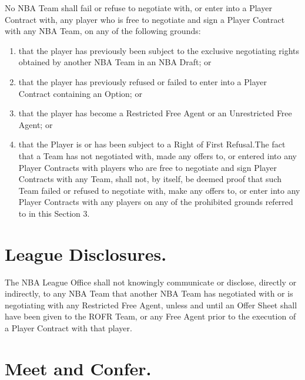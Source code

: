 \documentclass[
]{book}
\providecommand{\tightlist}{%
  \setlength{\itemsep}{0pt}\setlength{\parskip}{0pt}}
\begin{document}
No NBA Team shall fail or refuse to negotiate with, or enter into a Player Contract with, any player who is free to negotiate and sign a Player Contract with any NBA Team, on any of the following grounds:

\begin{enumerate}
\def\labelenumi{(\alph{enumi})}
\tightlist
\item
  that the player has previously been subject to the exclusive negotiating rights obtained by another NBA Team in an NBA Draft; or
\item
  that the player has previously refused or failed to enter into a Player Contract containing an Option; or
\item
  that the player has become a Restricted Free Agent or an Unrestricted Free Agent; or
\item
  that the Player is or has been subject to a Right of First Refusal.The fact that a Team has not negotiated with, made any offers to, or entered into any Player Contracts with players who are free to negotiate and sign Player Contracts with any Team, shall not, by itself, be deemed proof that such Team failed or refused to negotiate with, make any offers to, or enter into any Player Contracts with any players on any of the prohibited grounds referred to in this Section 3.
\end{enumerate}

\hypertarget{league-disclosures.}{%
\section{League Disclosures.}\label{league-disclosures.}}

The NBA League Office shall not knowingly communicate or disclose, directly or indirectly, to any NBA Team that another NBA Team has negotiated with or is negotiating with any Restricted Free Agent, unless and until an Offer Sheet shall have been given to the ROFR Team, or any Free Agent prior to the execution of a Player Contract with that player.

\hypertarget{meet-and-confer.}{%
\section{Meet and Confer.}\label{meet-and-confer.}}
\end{document}
